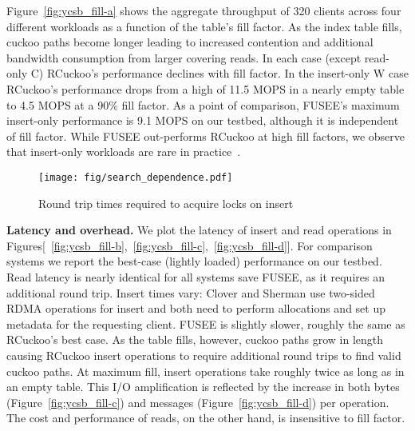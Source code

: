 Figure~\ref{fig:ycsb_fill-a} shows the aggregate throughput of 320
clients across four different workloads as a function of the table's
fill factor.  As the index table fills, cuckoo paths become longer
leading to increased contention and additional bandwidth consumption
from larger covering reads. In each case (except read-only C)
RCuckoo's performance declines with fill factor. In the insert-only
W case RCuckoo's performance drops from a high of 11.5 MOPS in a
nearly empty table to 4.5 MOPS at a 90\% fill factor.  As a point of
comparison, FUSEE's maximum insert-only performance is 9.1 MOPS on our
testbed, although it is independent of fill factor.  While FUSEE
out-performs RCuckoo at high fill factors, we observe that 
insert-only workloads are rare in
practice~\cite{facebook-memcached}.

\begin{figure}
\centering
        \texttt{[image: fig/search\_dependence.pdf]}
\caption{Round trip times required to acquire locks on insert}
             \label{fig:microbenchmarks-b}
\end{figure}


\textbf{Latency and overhead.} We plot
the latency of insert and read operations in
Figures[~\ref{fig:ycsb_fill-b},~\ref{fig:ycsb_fill-c},~\ref{fig:ycsb_fill-d}].  For comparison
systems we report the best-case (lightly loaded) performance on our testbed.  Read latency is nearly
identical for all systems save FUSEE, as it requires an additional round trip. Insert times vary:
Clover and Sherman use two-sided RDMA operations for insert and both need to perform allocations and
set up metadata for the requesting client.  FUSEE is slightly slower, roughly the same as RCuckoo's
best case.  As the table fills, however, cuckoo paths grow in length causing RCuckoo insert
operations to require additional round trips to find valid cuckoo paths.  At maximum fill, insert
operations take roughly twice as long as in an empty table. This I/O amplification is reflected by
the increase in both bytes (Figure~\ref{fig:ycsb_fill-c}) and messages
(Figure~\ref{fig:ycsb_fill-d}) per operation.  The cost and performance of reads, on the other hand,
is insensitive to fill factor.



